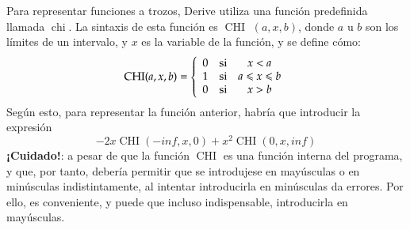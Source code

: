 \begin{enumerate}[leftmargin=*]
\begin{indicacion}
Para representar funciones a trozos, Derive utiliza una función predefinida llamada $\operatorname{chi}$. La sintaxis de esta función es
$\operatorname{CHI}$ $(a,x,b)$, donde $a$ u $b$ son los límites de un intervalo, y $x$ es la variable de la función, y se define cómo:
\[
\operatorname{CHI} (a,x,b) = \left\{ {\begin{array}{*{20}c}
   0 & {\text{si}} & {x < a}  \\
   1 & {\text{si}} & {a \leqslant x \leqslant b}  \\
   0 & {\text{si}} & {x > b}  \\

 \end{array} } \right.
\]
Según esto, para representar la función anterior, habría que introducir la expresión
\[
-2x \operatorname{CHI}(-inf,x,0)+x^2\operatorname{CHI}(0,x,inf)
\]
\textbf{¡Cuidado!}: a pesar de que la función $\operatorname{CHI}$ es una función interna del programa, y que, por tanto, debería permitir
que se introdujese en mayúsculas o en minúsculas indistintamente, al intentar introducirla en minúsculas da errores. Por ello, es
conveniente, y puede que incluso indispensable, introducirla en mayúsculas.
\end{indicacion}
\end{enumerate}


